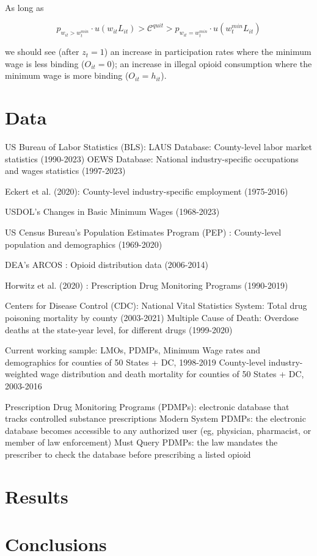 \documentclass[12pt,a4paper]{article}
\begin{document}
As long as

\[
    p_{w_{it} > w^{min}_t}\cdot u(w_{it}L_{it}) > \mathcal{C}^{quit} > p_{w_{it} = w^{min}_t}\cdot u(w^{min}_t L_{it})
\]

we should see (after \(z_{t} = 1\)) an increase in participation rates where the minimum wage is less binding (\(O_{it} = 0\)); an increase in illegal opioid consumption where the minimum wage is more binding (\(O_{it} = h_{it}\)).

\section*{Data}

US Bureau of Labor Statistics (BLS):
LAUS Database: County-level labor market statistics (1990-2023) %
OEWS Database: National industry-specific occupations and wages statistics (1997-2023) %

Eckert et al. (2020): County-level industry-specific employment (1975-2016)

USDOL's Changes in Basic Minimum Wages (1968-2023)

US Census Bureau's Population Estimates Program (PEP) : County-level population and demographics (1969-2020)

DEA's ARCOS : Opioid distribution data (2006-2014)

Horwitz et al. (2020) : Prescription Drug Monitoring Programs (1990-2019)

Centers for Disease Control (CDC):
National Vital Statistics System: Total drug poisoning mortality by county (2003-2021)
Multiple Cause of Death: Overdose deaths at the state-year level, for different drugs (1999-2020)

Current working sample:
LMOs, PDMPs, Minimum Wage rates and demographics for counties of 50 States + DC, 1998-2019
County-level industry-weighted wage distribution and death mortality for counties of 50 States + DC, 2003-2016

Prescription Drug Monitoring Programs (PDMPs): electronic database that tracks controlled substance prescriptions
Modern System PDMPs: the electronic database becomes accessible to any authorized user (eg, physician, pharmacist, or member of law enforcement)
Must Query PDMPs: the law mandates the prescriber to check the database before prescribing a listed opioid


\section*{Results}

\section*{Conclusions}

\printbibliography
\end{document}
